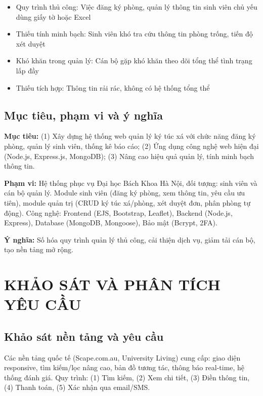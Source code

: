 \documentclass[12pt,a4paper]{article}
\begin{document}
\begin{itemize}
  \item Quy trình thủ công: Việc đăng ký phòng, quản lý thông tin sinh viên chủ yếu dùng giấy tờ hoặc Excel
  \item Thiếu tính minh bạch: Sinh viên khó tra cứu thông tin phòng trống, tiến độ xét duyệt
  \item Khó khăn trong quản lý: Cán bộ gặp khó khăn theo dõi tổng thể tình trạng lấp đầy
  \item Thiếu tích hợp: Thông tin rải rác, không có hệ thống tổng thể
\end{itemize}

\subsection{Mục tiêu, phạm vi và ý nghĩa}

\textbf{Mục tiêu:} (1) Xây dựng hệ thống web quản lý ký túc xá với chức năng đăng ký phòng, quản lý sinh viên, thống kê báo cáo; (2) Ứng dụng công nghệ web hiện đại (Node.js, Express.js, MongoDB); (3) Nâng cao hiệu quả quản lý, tính minh bạch thông tin.

\textbf{Phạm vi:} Hệ thống phục vụ Đại học Bách Khoa Hà Nội, đối tượng: sinh viên và cán bộ quản lý. Module sinh viên (đăng ký phòng, xem thông tin, yêu cầu ưu tiên), module quản trị (CRUD ký túc xá/phòng, xét duyệt đơn, phân phòng tự động). Công nghệ: Frontend (EJS, Bootstrap, Leaflet), Backend (Node.js, Express), Database (MongoDB, Mongoose), Bảo mật (Bcrypt, 2FA).

\textbf{Ý nghĩa:} Số hóa quy trình quản lý thủ công, cải thiện dịch vụ, giảm tải cán bộ, tạo nền tảng mở rộng.

\newpage
\section{KHẢO SÁT VÀ PHÂN TÍCH YÊU CẦU}

\subsection{Khảo sát nền tảng và yêu cầu}

Các nền tảng quốc tế (Scape.com.au, University Living) cung cấp: giao diện responsive, tìm kiếm/lọc nâng cao, bản đồ tương tác, thông báo real-time, hệ thống đánh giá. Quy trình: (1) Tìm kiếm, (2) Xem chi tiết, (3) Điền thông tin, (4) Thanh toán, (5) Xác nhận qua email/SMS.
\end{document}
